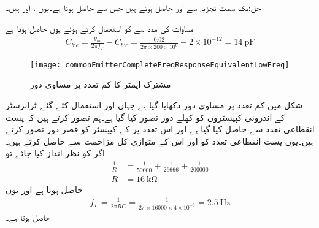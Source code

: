 حل:یک سمت  تجزیہ سے  اور  حاصل ہوتے ہیں جس سے  حاصل ہوتا ہے۔یوں ،  اور  ہیں۔

مساوات  کی مدد سے  کو استعمال کرتے ہوئے  یوں حاصل ہوتا ہے
\begin{align*}
C_{b'e} = \frac{g_m}{2 \pi  f_T}-C_{b'c}=\frac{0.02}{2 \pi  \times 200 \times 10^6}-2 \times 10^{-12}=\SI{14}{\pico \farad}
\end{align*}
%
\begin{figure}
\centering
\texttt{[image: commonEmitterCompleteFreqResponseEquivalentLowFreq]}
\caption{مشترک ایمٹر کا کم تعدد پر مساوی دور}
\label{شکل_تعددی_ردعمل_مشترک_مخارج_مکمل_تعددی_ردعمل_کم_تعددی_مساوی}
\end{figure}

شکل  میں کم تعدد پر مساوی دور دکھایا گیا ہے جہاں  اور  استعمال کئے گئے۔ٹرانزسٹر کے اندرونی کپیسٹروں کو کھلے دور تصور کیا گیا ہے۔ہم تصور کرتے ہیں کہ پست انقطاعی تعدد  سے حاصل کیا گیا ہے  اور اس تعدد پر  کے کپیسٹر کو قصر    دور تصور کرتے ہیں۔یوں پست انقطاعی تعدد  کو   اور اس کے متوازی کل مزاحمت  سے حاصل کرتے ہیں۔اگر  کو نظر انداز کیا جائے تو
\begin{align*}
\frac{1}{R}&=\frac{1}{50000}+\frac{1}{26666}+\frac{1}{200000}\\
R&=\SI{16}{\kilo \ohm}
\end{align*}
حاصل ہوتا ہے اور یوں
\begin{align*}
f_L=\frac{1}{2 \pi R C}=\frac{1}{2 \pi \times 16000 \times 4 \times 10^{-6}}=\SI{2.5}{\hertz}
\end{align*}
حاصل ہوتا ہے۔


